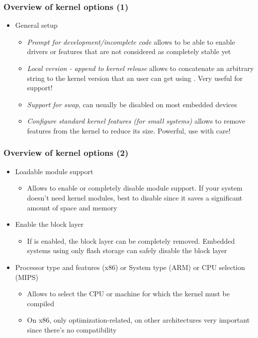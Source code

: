 \begin{frame}
  \frametitle{Overview of kernel options (1)}
  \begin{itemize}
  \item General setup
    \begin{itemize}
    \item {\em Prompt for development/incomplete code} allows to be
      able to enable drivers or features that are not considered as
      completely stable yet
    \item {\em Local version - append to kernel release} allows to
      concatenate an arbitrary string to the kernel version that an
      user can get using . Very useful for support!
    \item {\em Support for swap}, can usually be disabled on most
      embedded devices
    \item {\em Configure standard kernel features (for small systems)}
      allows to remove features from the kernel to reduce its
      size. Powerful, use with care!
    \end{itemize}
  \end{itemize}
\end{frame}

\begin{frame}
  \frametitle{Overview of kernel options (2)}
  \begin{itemize}
  \item Loadable module support
    \begin{itemize}
    \item Allows to enable or completely disable module support. If
      your system doesn't need kernel modules, best to disable since
      it saves a significant amount of space and memory
    \end{itemize}
  \item Enable the block layer
    \begin{itemize}
    \item If  is enabled, the block layer can be
      completely removed. Embedded systems using only flash storage
      can safely disable the block layer
    \end{itemize}
  \item Processor type and features (x86) or System type (ARM) or CPU selection
    (MIPS)
    \begin{itemize}
    \item Allows to select the CPU or machine for which the kernel
      must be compiled
    \item On x86, only optimization-related, on other architectures
      very important since there's no compatibility
    \end{itemize}
  \end{itemize}
\end{frame}

